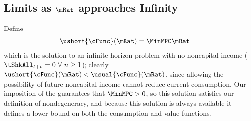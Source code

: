 \documentclass[ProjectDLO]{subfiles}
\begin{document}
\begin{comment}
  Third (Figure~\ref{fig:cGroTargetFig}), there are two special values of $\mRat$, which we will call the `individual balanced growth' point $\mStE$ because it is the point where expected consumption growth and expected permanent income growth are balanced, and the `individual target' $\mTrg$ such that if $\mRat_t = \mTrg$ then $\Ex_t [{\mRat}_{t+1}] = \mRat_t$.  %
  of permanent noncapital income.  (The individual consumer does not expect `balanced growth' at $\mTrg$).

  The final proposition suggested by Figure~\ref{fig:cGroTargetFig} is that the expected consumption growth factor is declining in the level of the cash-on-hand ratio $\mRat_{t}$.  This turns out to be true in the absence of permanent shocks, but in extreme cases it can be false if permanent shocks are present.\footnote{Throughout the remaining analysis I make a final assumption that is not strictly justified by the foregoing.  We have seen that the finite-horizon consumption functions $\usual{\cFunc}_{T-n}(\mRat)$ are twice continuously differentiable and strictly concave, and that they converge to a continuous function $\usual{\cFunc}(\mRat)$.  It does not strictly follow that the limiting function $\usual{\cFunc}(\mRat)$ is twice continuously differentiable, but I will assume that it is.}
\end{comment}

\renewcommand{\figFile}{cGroTargetFig}
\hypertarget{\figFile}{}


\hypertarget{LimitsAsmtToInfty}{}
\subsection{Limits as \texorpdfstring{$\mRat$}{m} approaches Infinity}\label{subsec:LimitsAsmtToInfty}

Define
\begin{align*}
  \ushort{\cFunc}(\mRat)  & = \MinMPC \mRat
\end{align*}
which is the solution to an infinite-horizon problem with no noncapital income ($\tShkAll_{t+n} = 0~\forall~n\geq1$); clearly $\ushort{\cFunc}(\mRat) < \usual{\cFunc}(\mRat)$, since allowing the possibility of future noncapital income cannot reduce current consumption.  Our imposition of the {\RIC} guarantees that $\MinMPC > 0$, so this solution satisfies our definition of nondegeneracy, and because this solution is always available it defines a lower bound on both the consumption and value functions.%
\end{document}
